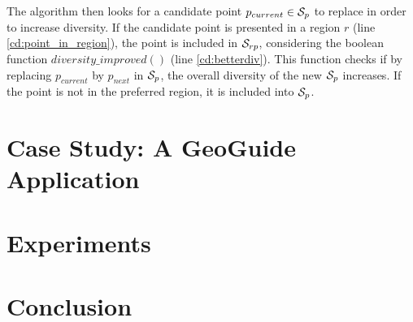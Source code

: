 \documentclass[runningheads,a4paper]{llncs}
\begin{document}
The algorithm then looks for a candidate point $p_{current} \in {\cal S}_p$ to replace in order to increase diversity. If the candidate point is presented in a region $r$ (line \ref{cd:point_in_region}), the point is included in ${\cal S}_{rp}$, considering the boolean function $\mathit{diversity\_improved}()$ (line \ref{cd:betterdiv}). This function checks if by replacing $p_{current}$ by $p_{next}$ in ${\cal S}_p$, the overall diversity of the new ${\cal S}_p$ increases. If the point is not in the preferred region, it is included into ${\cal S}_p$.

\section{Case Study: A GeoGuide Application}
\label{sec:scenario}

\section{Experiments}
\label{sec:experiments}


\section{Conclusion}
\label{sec:conclusions}





\vspace{-5pt}



\end{document}
